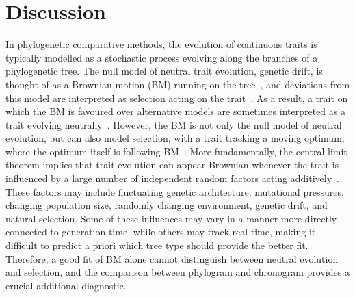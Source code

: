\documentclass{article}
\begin{document}
\section*{Discussion}
In phylogenetic comparative methods, the evolution of continuous traits is typically modelled as a stochastic process evolving along the branches of a phylogenetic tree.
The null model of neutral trait evolution, genetic drift, is thought of as a Brownian motion (BM) running on the tree~\citep{lynch_phenotypic_1986, felsenstein_phylogenies_1988a}, and deviations from this model are interpreted as selection acting on the trait~\citep{butler_phylogenetic_2004}.
As a result, a trait on which the BM is favoured over alternative models are sometimes interpreted as a trait evolving neutrally~\citep{khaitovich_evolution_2006, catalan_drift_2019}.
However, the BM is not only the null model of neutral evolution, but can also model selection, with a trait tracking a moving optimum, where the optimum itself is following BM~\citep{hansen_translating_1996, latrille_detecting_2024}.
More fundamentally, the central limit theorem implies that trait evolution can appear Brownian whenever the trait is influenced by a large number of independent random factors acting additively~\citep{felsenstein_phylogenies_1985}.
These factors may include fluctuating genetic architecture, mutational pressures, changing population size, randomly changing environment, genetic drift, and natural selection.
Some of these influences may vary in a manner more directly connected to generation time, while others may track real time, making it difficult to predict a priori which tree type should provide the better fit.
Therefore, a good fit of BM alone cannot distinguish between neutral evolution and selection, and the comparison between phylogram and chronogram provides a crucial additional diagnostic.
\end{document}
